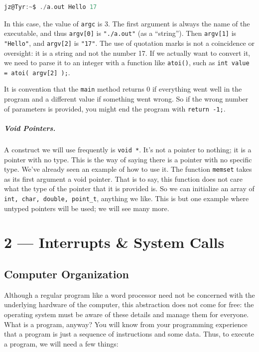 \documentclass[a4paper]{report}
\begin{document}
\begin{lstlisting}[language=C]
jz@Tyr:~$ ./a.out Hello 17
\end{lstlisting}

In this case, the value of \texttt{argc} is 3. The first argument is always the name of the executable, and thus \texttt{argv[0]} is \texttt{"./a.out"} (as a ``string''). Then \texttt{argv[1]} is \texttt{"Hello"}, and \texttt{argv[2]} is \texttt{"17"}.  The use of quotation marks is not a coincidence or oversight: it is a string and not the number 17. If we actually want to convert it, we need to parse it to an integer with a function like \texttt{atoi()}, such as \texttt{int value = atoi( argv[2] );}.

It is convention that the \texttt{main} method returns 0 if everything went well in the program and a different value if something went wrong. So if the wrong number of parameters is provided, you might end the program with \texttt{return -1;}.



\paragraph{Void Pointers.}

A construct we will use frequently is \texttt{void *}. It's not a pointer to nothing; it is a pointer with no type. This is the way of saying there is a pointer with no specific type. We've already seen an example of how to use it. The function \texttt{memset} takes as its first argument a void pointer. That is to say, this function does not care what the type of the pointer that it is provided is. So we can initialize an array of \texttt{int, char, double, point\_t}, anything we like. This is but one example where untyped pointers will be used; we will see many more.










\chapter*{2 --- Interrupts \& System Calls}


\section*{Computer Organization}
Although a regular program like a word processor need not be concerned with the underlying hardware of the computer, this abstraction does not come for free: the operating system must be aware of these details and manage them for everyone. What is a program, anyway? You will know from your programming experience that a program is just a sequence of instructions and some data. Thus, to execute a program, we will need a few things:
\end{document}
